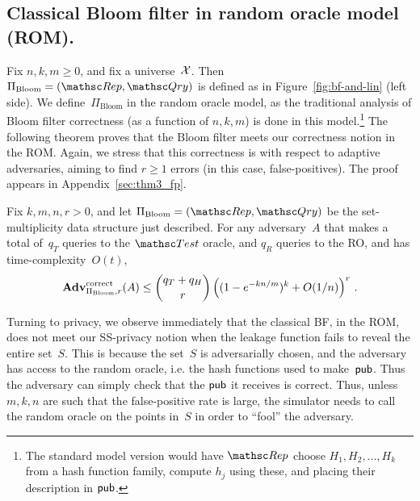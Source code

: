 \subsection{Classical Bloom filter in random oracle model (ROM). }

Fix $n,k,m \geq 0$, and fix a universe~${\cal X}$.  Then $\Pi_{\mathrm{Bloom}}= (\Rep, \Qry)$ is defined as in Figure~\ref{fig:bf-and-lin} (left side).  We define~$\Pi_{\mathrm{Bloom}}$ in the random oracle model, as the traditional analysis of Bloom filter correctness (as a function of $n,k,m$) is done in this model.\footnote{The standard model version would have $\Rep$ choose $H_1,H_2,\ldots,H_k$ from a hash function family, compute $h_j$ using these, and placing their description in ${\sf pub}$.}  The following theorem proves that the Bloom filter meets our correctness notion in the ROM.  Again, we stress that this correctness is with respect to adaptive adversaries, aiming to find $r \geq 1$ errors (in this case, false-positives).
The proof appears in Appendix~\ref{sec:thm3_fp}.

\begin{theorem}\label{thm3}\label{thm:bf-correctness}
Fix $k,m,n,r>0$, and let $\Pi_{\mathrm{Bloom}}= (\Rep, \Qry)$ be the set-multiplicity data structure just described. For any adversary~$A$ that makes a total of~$q_T$ queries to the $\Test$ oracle, and $q_R$ queries to the RO, and has time-complexity~$O(t)$,
\[
\mathrm{\mathbf{Adv}}^{\mathrm{correct}}_{\Pi_{\mathrm{Bloom}},r}(A) \leq  {\dbinom{q_T + q_H}{r}} \left( (1-e^{-kn/m})^k + O(1/n) \right)^r\,.
\]
\end{theorem}

%

Turning to privacy, we observe immediately that the classical BF, in the
ROM, does not meet our SS-privacy notion when the leakage function
fails to reveal the entire set~$S$.  This is because the set~$S$ is
adversarially chosen, and the adversary has access to the random
oracle, i.e. the hash functions used to make~${\sf pub}$.  Thus the
adversary can simply check that the ${\sf pub}$ it receives is correct.
Thus, unless $m,k,n$ are such that the false-positive rate is large,
the simulator needs to call the random oracle on the points in~$S$ in order to ``fool'' the adversary.

